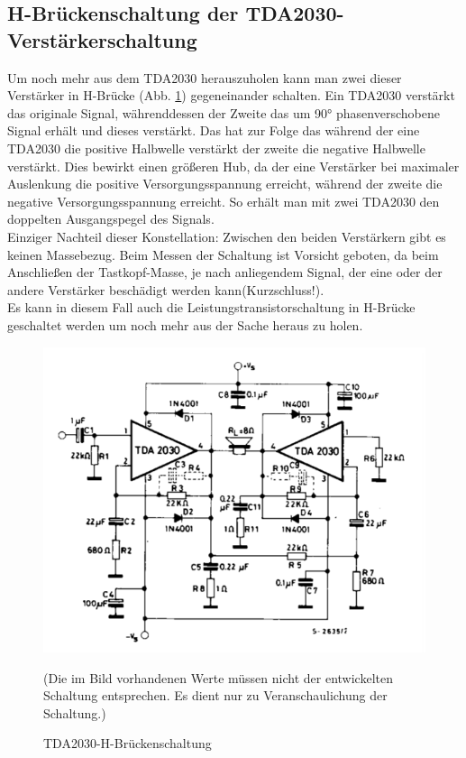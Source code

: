 \subsection{H-Brückenschaltung der TDA2030-Verstärkerschaltung}\label{subsec3.2.4}
Um noch mehr aus dem TDA2030 herauszuholen kann man zwei dieser Verstärker in H-Brücke (Abb. \ref{fig:3.2.4.1}) gegeneinander schalten. Ein TDA2030 verstärkt das originale Signal, währenddessen der Zweite das um 90° phasenverschobene Signal erhält und dieses verstärkt. Das hat zur Folge das während der eine TDA2030 die positive Halbwelle verstärkt der zweite die negative Halbwelle verstärkt. Dies bewirkt einen größeren Hub, da der eine Verstärker bei maximaler Auslenkung die positive Versorgungsspannung erreicht, während der zweite die negative Versorgungsspannung erreicht. So erhält man mit zwei TDA2030 den doppelten Ausgangspegel des Signals.\\
Einziger Nachteil dieser Konstellation: Zwischen den beiden Verstärkern gibt es keinen Massebezug. Beim Messen der Schaltung ist Vorsicht geboten, da beim Anschließen der Tastkopf-Masse, je nach anliegendem Signal, der eine oder der andere Verstärker beschädigt werden kann(Kurzschluss!).\\
Es kann in diesem Fall auch die Leistungstransistorschaltung in H-Brücke geschaltet werden um noch mehr aus der Sache heraus zu holen.
\begin{figure} [H]
	\centering
	\includegraphics[width=1\textwidth]{img/Grundlagen/TDA2030/TDA2030-H-Bruecke.PNG}
	\caption[TDA2030-H-Brückenschaltung]{TDA2030-H-Brückenschaltung\footnotemark}
	\text (Die im Bild vorhandenen Werte müssen nicht der entwickelten Schaltung entsprechen. Es dient nur zu Veranschaulichung der Schaltung.)
	\label {fig:3.2.4.1}
\end{figure}

